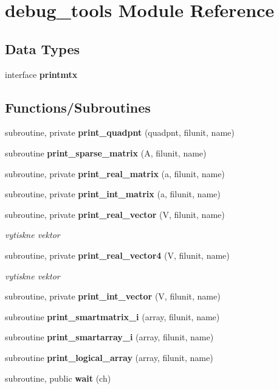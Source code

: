 \section{debug\+\_\+tools Module Reference}
\label{namespacedebug__tools}
\subsection*{Data Types}
\begin{DoxyCompactItemize}
\item 
interface {\bf printmtx}
\end{DoxyCompactItemize}
\subsection*{Functions/\+Subroutines}
\begin{DoxyCompactItemize}
\item 
subroutine, private {\bf print\+\_\+quadpnt} (quadpnt, filunit, name)
\item 
subroutine {\bf print\+\_\+sparse\+\_\+matrix} (A, filunit, name)
\item 
subroutine, private {\bf print\+\_\+real\+\_\+matrix} (a, filunit, name)
\item 
subroutine, private {\bf print\+\_\+int\+\_\+matrix} (a, filunit, name)
\item 
subroutine, private {\bf print\+\_\+real\+\_\+vector} (V, filunit, name)
\begin{DoxyCompactList}\small\item\em vytiskne vektor \end{DoxyCompactList}\item 
subroutine, private {\bf print\+\_\+real\+\_\+vector4} (V, filunit, name)
\begin{DoxyCompactList}\small\item\em vytiskne vektor \end{DoxyCompactList}\item 
subroutine, private {\bf print\+\_\+int\+\_\+vector} (V, filunit, name)
\item 
subroutine {\bf print\+\_\+smartmatrix\+\_\+i} (array, filunit, name)
\item 
subroutine {\bf print\+\_\+smartarray\+\_\+i} (array, filunit, name)
\item 
subroutine {\bf print\+\_\+logical\+\_\+array} (array, filunit, name)
\item 
subroutine, public {\bf wait} (ch)
\end{DoxyCompactItemize}


